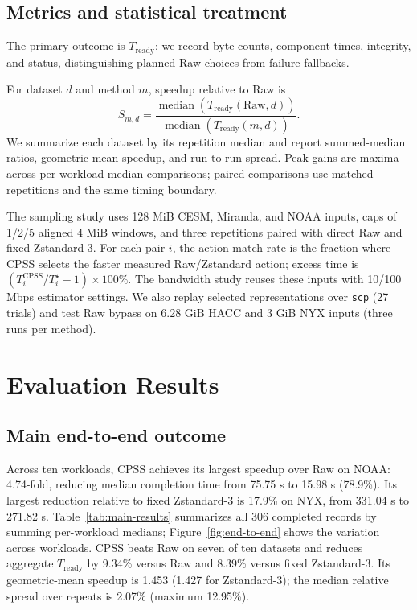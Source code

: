 \documentclass[smallabstract,smallcaptions]{dccpaper}
\renewcommand{\Section}[1]{\vspace*{-0.05in}\section{#1}\vspace{0.025in}}
\renewcommand{\SubSection}[1]{\vspace*{-0.125in}\subsection{#1}}
\begin{document}
\SubSection{Metrics and statistical treatment}
The primary outcome is $T_{\mathrm{ready}}$; we record byte counts, component times, integrity, and status, distinguishing planned Raw choices from failure fallbacks.

For dataset $d$ and method $m$, speedup relative to Raw is
\begin{equation}
S_{m,d}=\frac{\operatorname{median}(T_{\mathrm{ready}}(\mathrm{Raw},d))}
{\operatorname{median}(T_{\mathrm{ready}}(m,d))}.
\end{equation}
We summarize each dataset by its repetition median and report summed-median ratios, geometric-mean speedup, and run-to-run spread. Peak gains are maxima across per-workload median comparisons; paired comparisons use matched repetitions and the same timing boundary.

The sampling study uses 128 MiB CESM, Miranda, and NOAA inputs, caps of 1/2/5 aligned 4 MiB windows, and three repetitions paired with direct Raw and fixed Zstandard-3. For each pair $i$, the action-match rate is the fraction where CPSS selects the faster measured Raw/Zstandard action; excess time is $(T_i^{\mathrm{CPSS}}/T_i^\star-1)\times100\%$. The bandwidth study reuses these inputs with 10/100 Mbps estimator settings. We also replay selected representations over \texttt{scp} (27 trials) and test Raw bypass on 6.28 GiB HACC and 3 GiB NYX inputs (three runs per method).

\FloatBarrier
\Section{Evaluation Results}

\SubSection{Main end-to-end outcome}
Across ten workloads, CPSS achieves its largest speedup over Raw on NOAA: 4.74-fold, reducing median completion time from 75.75 s to 15.98 s (78.9\%). Its largest reduction relative to fixed Zstandard-3 is 17.9\% on NYX, from 331.04 s to 271.82 s. Table~\ref{tab:main-results} summarizes all 306 completed records by summing per-workload medians; Figure~\ref{fig:end-to-end} shows the variation across workloads. CPSS beats Raw on seven of ten datasets and reduces aggregate $T_{\mathrm{ready}}$ by 9.34\% versus Raw and 8.39\% versus fixed Zstandard-3. Its geometric-mean speedup is 1.453 (1.427 for Zstandard-3); the median relative spread over repeats is 2.07\% (maximum 12.95\%).
\end{document}
